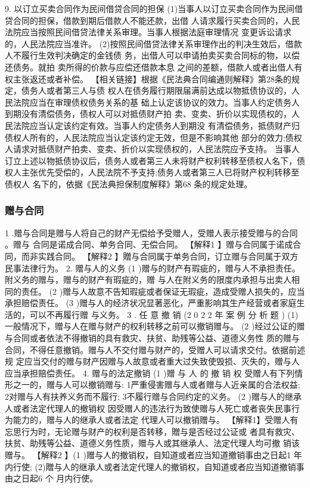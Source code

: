 \documentclass[UTF8,12pt]{ctexart}
\numberwithin{equation}{section} %
\numberwithin{figure}{section}
\numberwithin{table}{section}
\begin{document}
	9. 以订立买卖合同作为民间借贷合同的担保
	(1)当事人以订立买卖合同作为民间借贷合同的担保，借款到期后借款人不能还款，出借 人请求履行买卖合同的，人民法院应当按照民间借贷法律关系审理。当事人根据法庭审理情况 变更诉讼请求的，人民法院应当准许。
	(2)按照民间借贷法律关系审理作出的判决生效后，借款人不履行生效判决确定的金钱债 务，出借人可以申请拍卖买卖合同标的物，以偿还债务。就拍 卖所得的价款与应偿还借款本息 之间的差额，借款人或者出借人有权主张返还或者补偿。
	【相关链接】根据《民法典合同编通则解释》第28条的规定，债务人或者第三人与债 权人在债务履行期限届满前达成以物抵债协议的，人民法院应当在审理债权债务关系的基 础上认定该协议的效力。当事人约定债务人到期没有清偿债务，债权人可以对抵债财产拍 卖、变卖、折价以实现债权的，人民法院应当认定该约定有效。当事人约定债务人到期没 有清偿债务，抵债财产归债权人所有的，人民法院应当认定该约定无效，但是不影响其他 部分的效力;债权人请求对抵债财产拍卖、变卖、折价以实现债权的，人民法院应予支持。 当事人订立上述以物抵债协议后，债务人或者第三人未将财产权利转移至债权人名下，债 权人主张优先受偿的，人民法院不予支持;债务人或者第三人已将财产权利转移至债权人
	名下的，依据《民法典担保制度解释》第68 条的规定处理。
	
	\subsubsection{赠与合同}
	1 .赠与合同是赠与人将自己的财产无偿给予受赠人，受赠人表示接受赠与的合同 。赠与 合同是诺成合同、单务合同、无偿合同。
	【解释1 】赠与合同属于诺成合同，而非实践合同。
	【解释2 】贈与合同属于单务合同，订立赠与合同属于双方民事法律行为。
	2. 赠与人的义务
	(1 )赠与的财产有瑕疵的，赠与人不承担责任。附义务的赠与，赠与的财产有瑕疵的，赠 与人在附义务的限度内承担与出卖人相同的责任。
	(2 )赠与人故意不告知瑕疵或者保证无瑕疵，造成受赠人损失的，应当承担赔偿责任。
	(3 )赠与人的经济状况显著恶化，严重影响其生产经营或者家庭生活的，可以不再履行赠 与义务。
	3 . 任 意 撤 销 (2 0 2 2 年 案 例 分 析 题 )
	(1) 一般情况下，赠与人在赠与财产的权利转移之前可以撤销赠与。
	(2 )经过公证的赠与合同或者依法不得撤销的具有救灾、扶贫、助残等公益、道德义务性
	质的赠与合同，不得任意撤销。赠与人不交付赠与财产的，受赠人可以请求交付。依据前述规 定应当交付的赠与财产因赠与人故意或者重大过失致使毁损、灭失的，赠与人应当承担赔偿责任。
	4. 赠与的法定撤销 (1 )赠 与 人 的 撤 销 权
	受赠人有下列情形之一的，赠与人可以撤销赠与: 1严重侵害赠与人或者赠与人近亲属的合法权益;
	2对赠与人有扶养义务而不履行;
	3不履行赠与合同约定的义务。
	(2 )赠与人的继承人或者法定代理人的撤销权 因受赠人的违法行为致使赠与人死亡或者丧失民事行为能力的，赠与人的继承人或者法定 代理人可以撤销赠与。
	【解释1】受赠人有忘思行为时，无论赠与财产的权利是否转移，贈与是否经过公证或 者具有救灾、扶贫、助残等公益、道德义务性质，赠与人或其继承人、法定代理人均可撤 销该赠与。
	【解释2 】(1 )赠与人的撤销权，自知道或者应当知道撤销事由之日起1 年内行使; (2)贈与人的继承人或者法定代理人的撤销权，自知道或者应当知道撤销事由之日起6 个 月内行使。
	
\end{document}
